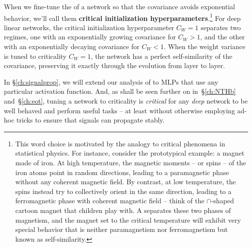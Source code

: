When we fine-tune the  of a network so that the covariance avoids exponential behavior, we'll call them \textbf{critical initialization hyperparameters}.\footnote{This word choice is motivated by the analogy to critical phenomena in statistical physics. For instance, consider the prototypical example: a magnet made of iron. At high temperature, the magnetic moments -- or spins -- of the iron atoms point in random directions, leading to a paramagnetic phase without any coherent magnetic field. By contrast, at low temperature, the spins instead try to collectively orient in the same direction, leading to a ferromagnetic phase with coherent magnetic field -- think of the $\cap$-shaped cartoon magnet that children play with. A  separates these two phases of magnetism, and the magnet set to the critical temperature will exhibit very special behavior that is neither paramagnetism nor ferromagnetism but known as self-similarity.}
For deep linear networks, the critical initialization hyperparameter $C_W=1$ separates two regimes, one with an exponentially growing covariance for $C_W>1$, and the other with an exponentially decaying covariance for $C_W<1$.
When the weight variance is tuned to criticality $C_W=1$, the network has a perfect self-similarity of the covariance, preserving it exactly through the evolution from layer to layer.


In \S\ref{ch:signalprop}, we will extend our analysis of  to MLPs that use any 
particular
activation function. And, as shall be seen further on
in~\S\ref{ch:NTHb} and~\S\ref{ch:eot},
tuning a network to criticality is \emph{critical} for any \emph{deep} network to be well behaved and perform useful tasks -- at least without otherwise employing ad-hoc
tricks to ensure that signals can propagate stably.






